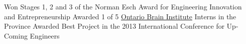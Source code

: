 %
%
%

\begin{scholarship}
			{Won Stages 1, 2 and 3 of the Norman Esch Award for Engineering Innovation and Entrepreneurship}			
			{Awarded 1 of 5 \href{https://braininstitute.ca/}{Ontario Brain Institute} Interns in the Province}	
			{Awarded Best Project in the 2013 International Conference for Up-Coming Engineers}			
\end{scholarship}